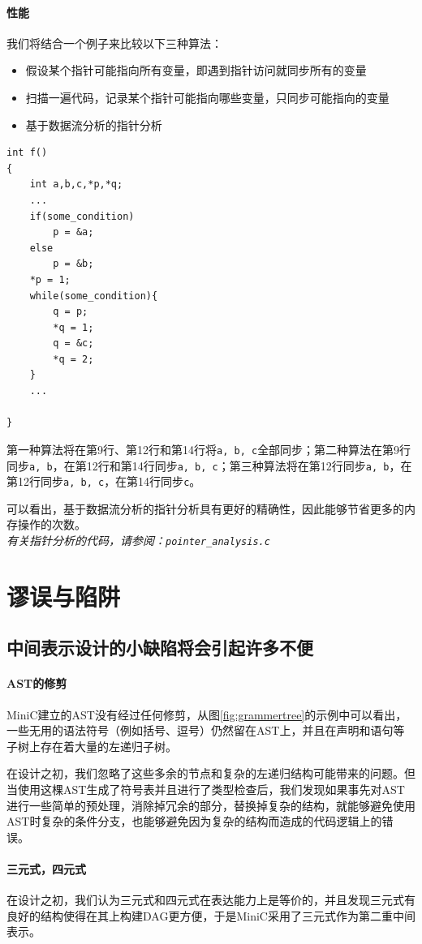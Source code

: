\paragraph*{性能}
我们将结合一个例子来比较以下三种算法：
\begin{itemize}
	\item 假设某个指针可能指向所有变量，即遇到指针访问就同步所有的变量
	\item 扫描一遍代码，记录某个指针可能指向哪些变量，只同步可能指向的变量
	\item 基于数据流分析的指针分析
\end{itemize}
\begin{lstlisting}
int f()
{
	int a,b,c,*p,*q;
	...
	if(some_condition)
		p = &a;
	else
		p = &b;
	*p = 1;
	while(some_condition){
		q = p;
		*q = 1;
		q = &c;
		*q = 2;
	}
	...

}
\end{lstlisting}
第一种算法将在第9行、第12行和第14行将\verb|a, b, c|全部同步；第二种算法在第9行同步\verb|a, b|，在第12行和第14行同步\verb|a, b, c|；第三种算法将在第12行同步\verb|a, b|，在第12行同步\verb|a, b, c|，在第14行同步\verb|c|。

可以看出，基于数据流分析的指针分析具有更好的精确性，因此能够节省更多的内存操作的次数。\\
{\it \anchor 有关指针分析的代码，请参阅：\verb|pointer_analysis.c|}\\
\section{谬误与陷阱}
\label{pitfallc2}
\subsection*{中间表示设计的小缺陷将会引起许多不便}
\paragraph*{AST的修剪}
MiniC建立的AST没有经过任何修剪，从图\ref{fig:grammertree}的示例中可以看出，一些无用的语法符号（例如括号、逗号）仍然留在AST上，并且在声明和语句等子树上存在着大量的左递归子树。

在设计之初，我们忽略了这些多余的节点和复杂的左递归结构可能带来的问题。但当使用这棵AST生成了符号表并且进行了类型检查后，我们发现如果事先对AST进行一些简单的预处理，消除掉冗余的部分，替换掉复杂的结构，就能够避免使用AST时复杂的条件分支，也能够避免因为复杂的结构而造成的代码逻辑上的错误。

\paragraph*{三元式，四元式}
在设计之初，我们认为三元式和四元式在表达能力上是等价的，并且发现三元式有良好的结构使得在其上构建DAG更方便，于是MiniC采用了三元式作为第二重中间表示。

